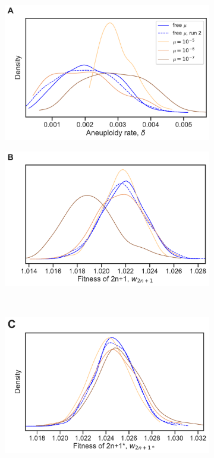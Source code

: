\documentclass[12pt]{extarticle}
\begin{document}
    
\begin{figure}[p]
  \centering
  \begin{subfigure}{0.45\textwidth}
      \includegraphics[width=\textwidth]{../figures/mu-A.pdf}      
  \end{subfigure}
  \begin{subfigure}{0.45\textwidth}
      \includegraphics[width=\textwidth]{../figures/mu-B.pdf}      
  \end{subfigure}
  \\
   \begin{subfigure}{0.45\textwidth}
      \includegraphics[width=\textwidth]{../figures/mu-C.pdf}      

\end{subfigure}
\end{figure}
\end{document}
